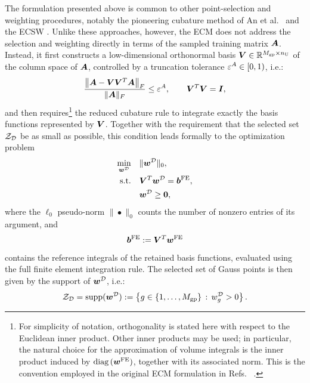 \documentclass[preprint,10pt]{elsarticle}  %
\begin{document}
The formulation presented above is common to other  point-selection and weighting
procedures, notably the pioneering cubature method of
An et al.~\cite{an2009optimizing} and the  ECSW
 \cite{farhat2014dimensional}.  Unlike these approaches, however, the ECM does not
address the selection and weighting  directly in terms of the sampled
training matrix \(\bm{A}\).  Instead, it first constructs a low-dimensional orthonormal basis
\(\bm{V}\in\mathbb{R}^{M_{\mathrm{gp}} \times n_{\mathrm U}}\)  of the column space of $\bm{A}$, controlled by a  truncation tolerance
 \(\varepsilon^A\in[0,1)\), i.e.:
\begin{equation}
\label{eq:Ucub_definition}
\dfrac{
\left\|
\bm{A}-\bm{V}\bm{V}^T\bm{A}
\right\|_F
}{
\|\bm{A}\|_F
}
\leq \varepsilon^A, \qquad \bm{V}^T \bm{V} = \bm{I},
\end{equation}
and then requires\footnote{For simplicity of notation, orthogonality is stated here
with respect to the Euclidean inner product. Other inner products may
be used; in particular, the natural choice for the approximation of
volume integrals is the   inner product induced by
\(\operatorname{diag}{(\bm{w}^{\mathrm{FE}})}\), together with its associated norm. This is the
convention employed in the original ECM formulation in Refs.~ \cite{hernandez2017dimensional,hernandez2020multiscale,hernandez2024cecm}.} the reduced
cubature rule to integrate exactly the basis functions represented by
    \(\bm{V}\). Together with the requirement that the
selected set \(\mathcal{Z}_{\mathcal{D}}\) be as small as possible, this condition leads
formally to the optimization problem
\begin{equation}
\label{eq:ECM_problem_manifold_fixed}
\begin{aligned}
\min_{\bm{w}^{\mathcal{D}}}\quad
& \|\bm{w}^{\mathcal{D}}\|_0,
\\
\text{\rm s.t.}\quad
& \bm{V}^T\bm{w}^{\mathcal{D}}=\bm{b}^{\mathrm{FE}},
\\
& \bm{w}^{\mathcal{D}}\geq\bm{0},
\end{aligned}
\end{equation}
where the \(\ell_0\) pseudo-norm \(\|\bullet\|_0\) counts the number
of nonzero entries of its argument, and
\begin{equation}
\label{eq:bcub_definition}
\bm{b}^{\mathrm{FE}}
:=
\bm{V}^T\bm{w}^{\mathrm{FE}}
\end{equation}
contains the reference integrals of the retained basis functions,
evaluated using the full finite element integration rule. The selected  set of Gauss points is then given
by the support of \(\bm{w}^{\mathcal{D}}\), i.e.:
\begin{equation}
\label{eq:ZD_support}
\mathcal{Z}_{\mathcal{D}}
=
\operatorname{supp}(\bm{w}^{\mathcal{D}})
:=
\left\{
g\in\{1,\ldots,M_{\mathrm{gp}}\}
\,:\,
w^{\mathcal{D}}_{g}>0
\right\}.
\end{equation}
\end{document}
